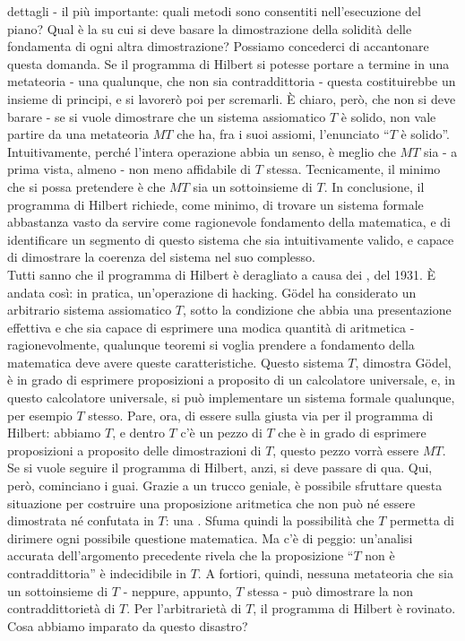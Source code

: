 dettagli - il più importante: quali metodi sono consentiti nell'esecuzione del piano? Qual è la  su cui si deve basare la dimostrazione della solidità delle fondamenta di ogni altra dimostrazione? Possiamo concederci di accantonare questa domanda.
Se il programma di Hilbert si potesse portare a termine in una metateoria - una qualunque, che non sia contraddittoria - questa costituirebbe un insieme di principi, e si lavorerò poi per scremarli. È chiaro, però, che non si deve barare - se si vuole dimostrare che un sistema assiomatico
$T$ è solido, non vale partire da una metateoria $MT$ che ha, fra i suoi assiomi, l'enunciato ``$T$ è solido''. Intuitivamente, perché l'intera operazione abbia un senso, è meglio che $MT$ sia - a prima vista, almeno - non meno affidabile di $T$ stessa.
Tecnicamente, il minimo che si possa pretendere è che $MT$ sia un sottoinsieme di $T$. In conclusione, il programma di Hilbert richiede, come minimo, di trovare un sistema formale abbastanza vasto da servire come ragionevole fondamento della matematica, e di identificare un segmento di questo sistema che 
sia intuitivamente valido, e capace di dimostrare la coerenza del sistema nel suo complesso.\\
Tutti sanno che il programma di Hilbert è deragliato a causa dei , del 1931. È andata così: in pratica, un'operazione di hacking. Gödel ha considerato un arbitrario sistema assiomatico $T$,
sotto la condizione che abbia una presentazione effettiva e che sia capace di esprimere una modica quantità di aritmetica - ragionevolmente, qualunque teoremi si voglia prendere a fondamento della matematica deve avere queste caratteristiche. Questo sistema $T$, dimostra Gödel, è in grado di esprimere 
proposizioni a proposito di un calcolatore universale, e, in questo calcolatore universale, si può implementare un sistema formale qualunque, per esempio $T$ stesso. Pare, ora, di essere sulla giusta via per il programma di Hilbert: abbiamo $T$, e dentro $T$
c'è un pezzo di $T$ che è in grado di esprimere proposizioni a proposito delle dimostrazioni di $T$, questo pezzo vorrà essere $MT$.
Se si vuole seguire il programma di Hilbert, anzi, si deve passare di qua. Qui, però, cominciano i guai. Grazie a un trucco geniale, è possibile sfruttare questa situazione per costruire una proposizione aritmetica che non 
può né essere dimostrata né confutata in $T$: una . Sfuma quindi la possibilità che $T$ permetta di dirimere ogni possibile questione matematica. Ma c'è di peggio: un'analisi accurata dell'argomento precedente rivela che la proposizione ``$T$ non è contraddittoria''
è indecidibile in $T$. A fortiori, quindi, nessuna metateoria che sia un sottoinsieme di $T$ - neppure, appunto, $T$ stessa - può dimostrare la non contraddittorietà di $T$.
Per l'arbitrarietà di $T$, il programma di Hilbert è rovinato.\\
Cosa abbiamo imparato da questo disastro?